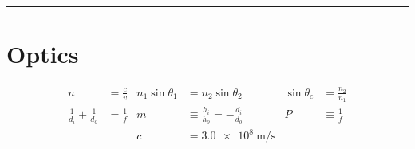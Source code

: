\documentclass[10pt]{exam}
\begin{document}
\hrule

\section*{Optics}

\begin{align*}
  n &= \frac{c}{v} &
  n_1 \sin\theta_1 &= n_2\sin\theta_2 &
  \sin\theta_c &= \frac{n_2}{n_1} \\
  \frac{1}{d_i} + \frac{1}{d_o} &= \frac{1}{f} &
  m &\equiv \frac{h_i}{h_o} = -\frac{d_i}{d_o} &
  P &\equiv \frac{1}{f} \\
  &&
  c &= \SI {3.0e8}{\meter\per\second}
\end{align*}
\end{document}
